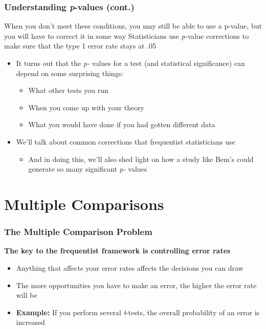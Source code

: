 \documentclass[10pt, block=fill]{beamer}
\begin{document}
\begin{frame}
  \frametitle{Understanding \textit{p}-values (cont.)}
  
  \begin{block}{When you don't meet these conditions, you may still be able to use a p-value, but you will have to correct it in some way}
    Statisticians use \textit{p-}value corrections to make sure that the type 1 error rate stays at .05
  \end{block}
  
  \begin{itemize}
    \item  It turns out that the \textit{p-} values for a test (and statistical significance) can depend on some surprising things:
    \begin{itemize}
      \item What other tests you run
      \item When you come up with your theory
      \item What you would have done if you had gotten different data
    \end{itemize}
    \item We'll talk about common corrections that frequentist statisticians use
    \begin{itemize}
      \item And in doing this, we'll also shed light on how a study like Bem's could generate so many significant \textit{p-} values
    \end{itemize}
  \end{itemize}
\end{frame}



\section{Multiple Comparisons}

\begin{frame}
  \frametitle{The Multiple Comparison Problem}

  \textbf{The key to the frequentist framework is controlling error rates}
  
  \vspace{0.25in}
  
  \begin{itemize}
    \item Anything that affects your error rates affects the decisions you can draw
    \item The more opportunities you have to make an error, the higher the error rate will be 
    \item \textbf{Example:} If you perform several \textit{t}-tests, the overall probability of an error is increased
  \end{itemize}
\end{frame}
\end{document}
